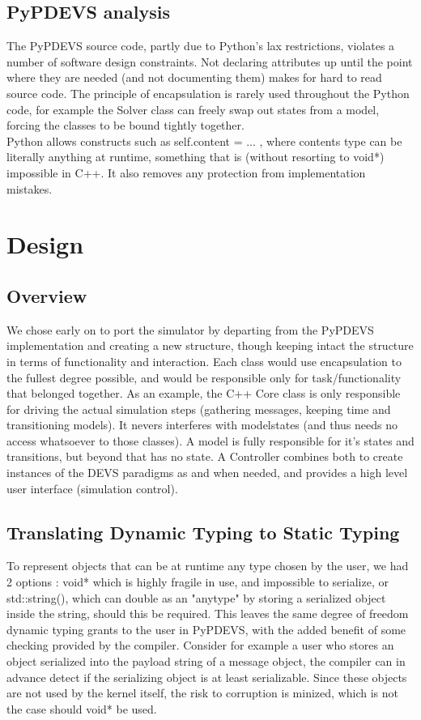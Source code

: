\documentclass[8pt,a4paper]{report}
\begin{document}
\section{PyPDEVS analysis}
The PyPDEVS source code, partly due to Python's lax restrictions, violates a number of software design constraints. Not declaring attributes up until the point where they are needed (and not documenting them) makes for hard to read source code. The principle of encapsulation is rarely used throughout the Python code, for example the Solver class can freely swap out states from a model, forcing the classes to be bound tightly together. \\ %
Python allows constructs such as self.content = ... , where contents type can be literally anything at runtime, something that is (without resorting to void*) impossible in C++. It also removes any protection from implementation mistakes.

\chapter{Design}
\section{Overview}
We chose early on to port the simulator by departing from the PyPDEVS implementation and creating a new structure, though keeping intact the structure in terms of functionality and interaction. Each class would use encapsulation to the fullest degree possible, and would be responsible only for task/functionality that belonged together. As an example, the C++ Core class is only responsible for driving the actual simulation steps (gathering messages, keeping time and transitioning models). It nevers interferes with modelstates (and thus needs no access whatsoever to those classes). A model is fully responsible for it's states and transitions, but beyond that has no state. A Controller combines both to create instances of the DEVS paradigms as and when needed, and provides a high level user interface (simulation control).

\section{Translating Dynamic Typing to Static Typing}
To represent objects that can be at runtime any type chosen by the user, we had 2 options : void* which is highly fragile in use, and impossible to serialize, or std::string(), which can double as an "anytype" by storing a serialized object inside the string, should this be required. This leaves the same degree of freedom dynamic typing grants to the user in PyPDEVS, with the added benefit of some checking provided by the compiler. Consider for example a user who stores an object serialized into the payload string of a message object, the compiler can in advance detect if the serializing object is at least serializable. Since these objects are not used by the kernel itself, the risk to corruption is minized, which is not the case should void* be used.
\end{document}
